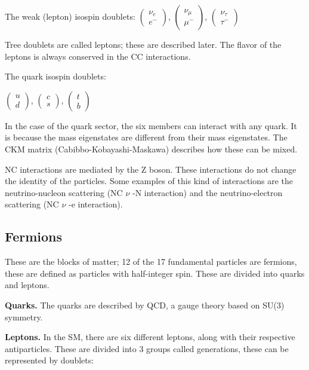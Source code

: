 The weak (lepton) isospin doublets:
$\begin{pmatrix}
    \nu_e \\
    e^-
\end{pmatrix}$, 
$\begin{pmatrix}
    \nu_\mu \\
    \mu^-
\end{pmatrix}$, 
$\begin{pmatrix}
    \nu_\tau \\
    \tau^-
\end{pmatrix}$


Tree doublets are called leptons; these are described later. The flavor of the leptons is always conserved in the CC interactions. 

The quark isospin doublets:

$\begin{pmatrix}
    u \\
    d
\end{pmatrix}$, 
$\begin{pmatrix}
    c \\
    s
\end{pmatrix}$, 
$\begin{pmatrix}
    t \\
    b
\end{pmatrix}$

In the case of the quark sector, the six members can interact with any quark. It is because the mass eigenstates are different from their mass eigenstates. The CKM matrix (Cabibbo-Kobayashi-Maskawa) describes how these can be mixed. 

 NC interactions are mediated by the Z boson. These interactions do not change the identity of the particles. Some examples of this kind of interactions are the neutrino-nucleon scattering (NC $\nu$ -N interaction) and the neutrino-electron scattering (NC $\nu$ -e interaction). 



\subsection{Fermions}
These are the blocks of matter; 12 of the 17 fundamental particles are fermions, these are defined as particles with half-integer spin. These are divided into quarks and leptons. 

\textbf{Quarks.}
The quarks are described by QCD, a gauge theory based on SU(3) symmetry.  

\textbf{Leptons.}
In the SM, there are six different leptons, along with their respective antiparticles. These are divided into 3 groups called generations, these can be represented by doublets: 

